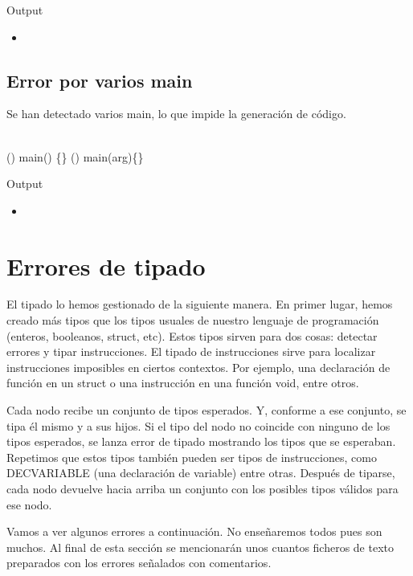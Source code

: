 Output

\begin{itemize}
	\item {}
\end{itemize}

\newpage
\subsection{Error por varios main}
Se han detectado varios main, lo que impide la generación de código.

\begin{algorithm}
	\\
	\Void () main() \{\}\;
	\Integer{}(\Integer{}) main(arg)\{\}\;
\end{algorithm}

Output

\begin{itemize}
	\item {}
\end{itemize}


\newpage
\section{Errores de tipado}

El tipado lo hemos gestionado de la siguiente manera. En primer lugar, hemos creado más tipos que los tipos usuales
de nuestro lenguaje de programación (enteros, booleanos, struct, etc). Estos tipos sirven para dos cosas: detectar errores
y tipar instrucciones. El tipado de instrucciones sirve para localizar instrucciones imposibles en ciertos contextos. Por
ejemplo, una declaración de función en un struct o una instrucción \Return{} en una función void, entre otros.

Cada nodo recibe un conjunto de tipos esperados. Y, conforme a ese conjunto, se tipa él mismo y a sus hijos. Si el tipo del
nodo no coincide con ninguno de los tipos esperados, se lanza error de tipado mostrando los tipos que se esperaban. Repetimos
que estos tipos también pueden ser tipos de instrucciones, como DECVARIABLE (una declaración de variable) entre otras. Después 
de tiparse, cada nodo devuelve hacia arriba un conjunto con los posibles tipos válidos para ese nodo.

Vamos a ver algunos errores a continuación. No enseñaremos todos pues son muchos. Al final de esta sección se mencionarán
unos cuantos ficheros de texto preparados con los errores señalados con comentarios.
\\

